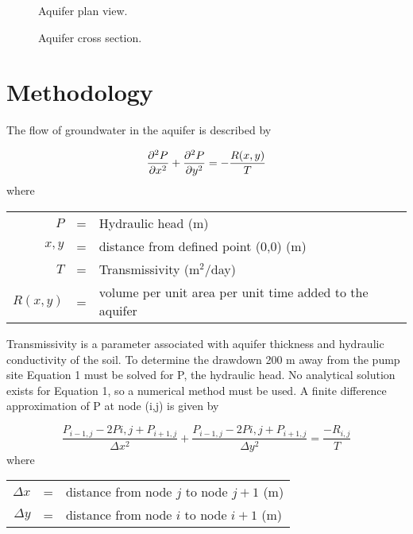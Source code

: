 \documentclass[titlepage,11pt]{article}
\begin{document}
\begin{figure}[h]
    \begin{center}
         \caption{Aquifer plan view.}
    \end{center}
\end{figure}
\begin{figure}[h]
    \begin{center}
         \caption{Aquifer cross section.}
    \end{center}
\end{figure}
\newpage
\section{Methodology}
The flow of groundwater in the aquifer is described by
\begin{singlespacing}
    \begin{equation}
        \frac{\partial^2 P}{\partial x^2}+\frac{\partial^2 P}{\partial
        y^2}=-\frac{R(x,y)}{T}\\
    \end{equation}
    where
    \begin{center}
        \begin{tabular}{rcl}
            $P$&=&Hydraulic head (m)\\
            $x,y$&=&distance from defined point (0,0) (m)\\
            $T$ &=&Transmissivity (m$^2$/day)\\
            $R(x,y)$ &=& volume per unit area per unit time added to the aquifer\\
        \end{tabular}
    \end{center}
\end{singlespacing}

Transmissivity is a parameter associated with aquifer thickness and
hydraulic conductivity of the soil.  To determine the drawdown 200 m
away from the pump site Equation 1 must be solved for P, the
hydraulic head. No analytical solution exists for Equation 1, so a
numerical method must be used.  A finite difference approximation of
P at node (i,j) is given by

\begin{singlespacing}
    \begin{equation}
        \frac{P_{i-1,j}-2P{i,j}+P_{i+1,j}}{\Delta x^2} +
        \frac{P_{i-1,j}-2P{i,j}+P_{i+1,j}}{\Delta y^2} =
        \frac{-R_{i,j}}{T}
\end{equation}
    where
    \begin{center}
        \begin{tabular}{rcl}
            $\Delta x$&=&distance from node $j$ to node $j+1$ (m)\\
            $\Delta y$&=&distance from node $i$ to node $i+1$ (m)
        \end{tabular}
    \end{center}
\end{singlespacing}
\end{document}
